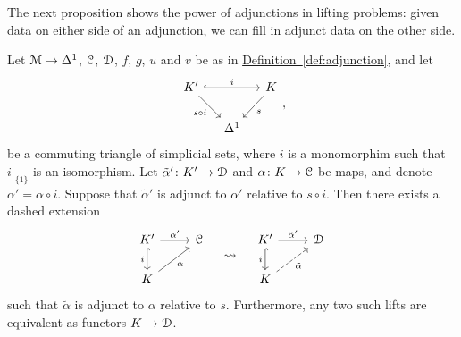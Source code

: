 \documentclass[main.tex]{subfiles}
\begin{document}
The next proposition shows the power of adjunctions in lifting problems: given data on either side of an adjunction, we can fill in adjunct data on the other side.

\begin{proposition}
  \label{prop:can_transport_adjunct_data}
  Let $\mathcal{M} \to \Delta^{1}$, $\mathcal{C}$, $\mathcal{D}$, $f$, $g$, $u$ and $v$ be as in \hyperref[def:adjunction]{Definition~\ref*{def:adjunction}}, and let
  \begin{equation*}
    \begin{tikzcd}[column sep=small]
      K'
      \arrow[rr, hook, "i"]
      \arrow[dr, swap, "s \circ i"]
      && K
      \arrow[dl, "s"]
      \\
      & \Delta^{1}
    \end{tikzcd},
  \end{equation*}
  be a commuting triangle of simplicial sets, where $i$ is a monomorphim such that $i|_{\{1\}}$ is an isomorphism. Let $\tilde{\alpha}'\colon K' \to \mathcal{D}$ and $\alpha\colon K \to \mathcal{C}$ be maps, and denote $\alpha' = \alpha \circ i$. Suppose that $\tilde{\alpha}'$ is adjunct to $\alpha'$ relative to $s \circ i$. Then there exists a dashed extension
  \begin{equation}
    \label{eq:adjunct_filling_problems}
    \begin{tikzcd}
      K'
      \arrow[r, "\alpha'"]
      \arrow[d, swap, hook, "i"]
      & \category{C}
      \\
      K
      \arrow[ur, swap, "\alpha"]
    \end{tikzcd}
    \quad \rightsquigarrow \quad
    \begin{tikzcd}
      K'
      \arrow[r, "\tilde{\alpha}'"]
      \arrow[d, swap, hook, "i"]
      & \category{D}
      \\
      K
      \arrow[ur, dashed, swap, "\tilde{\alpha}"]
    \end{tikzcd}
  \end{equation}
  such that $\tilde{\alpha}$ is adjunct to $\alpha$ relative to $s$. Furthermore, any two such lifts are equivalent as functors $K \to \mathcal{D}$.

\end{proposition}
\end{document}
